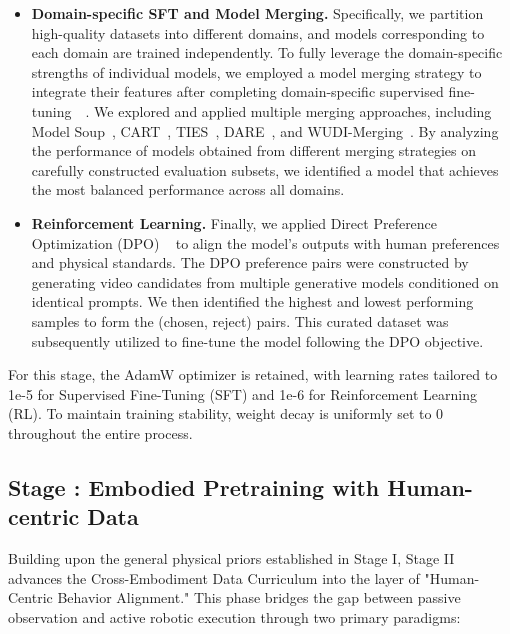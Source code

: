 \documentclass{llmxive}
\begin{document}
\begin{itemize}
\item \textbf {Domain-specific SFT and Model Merging.} Specifically, we partition high-quality datasets into different domains, and models corresponding to each domain are trained independently. To fully leverage the domain-specific strengths of individual models, we employed a model merging strategy to integrate their features after completing domain-specific supervised fine-tuning~\citep{tang2025fusionbench}~\citep{yang2026ModelMergingSurvey}. We explored and applied multiple merging approaches, including Model Soup~\citep{wortsman2022modelsoupsaveragingweights}, CART~\citep{choi2024revisiting}, TIES~\citep{yadav2023tiesmergingresolvinginterferencemerging}, DARE~\citep{yu2024languagemodelssupermario}, and WUDI-Merging~\citep{cheng2025startedinterferenceendit}. By analyzing the performance of models obtained from different merging strategies on carefully constructed evaluation subsets, we identified a model that achieves the most balanced performance across all domains. 


\item \textbf {Reinforcement Learning.}
Finally, we applied Direct Preference Optimization (DPO) ~\citep{wallace2023diffusion,rafailov2024directpreferenceoptimizationlanguage,liu2025videodpo} to align the model’s outputs with human preferences and physical standards. The DPO preference pairs were constructed by generating video candidates from multiple generative models conditioned on identical prompts. We then identified the highest and lowest performing samples to form the (chosen, reject) pairs. This curated dataset was subsequently utilized to fine-tune the model following the DPO objective.

\end{itemize}

For this stage, the AdamW optimizer is retained, with learning rates tailored to 1e-5 for Supervised Fine-Tuning (SFT) and 1e-6 for Reinforcement Learning (RL). To maintain training stability, weight decay is uniformly set to 0 throughout the entire process.


\subsection{Stage \uppercase\expandafter{}: Embodied Pretraining with Human-centric Data}

Building upon the general physical priors established in Stage I, Stage II advances the Cross-Embodiment Data Curriculum into the layer of "Human-Centric Behavior Alignment." This phase bridges the gap between passive observation and active robotic execution through two primary paradigms:
\end{document}
